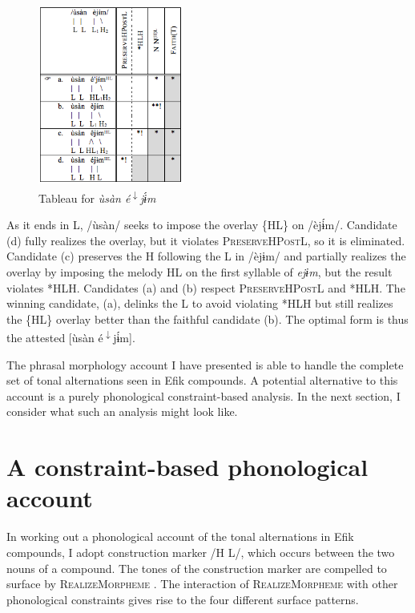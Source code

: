 \documentclass[output=paper]{langscibook}
\begin{document}
  
\begin{figure}
\includegraphics[width=48mm]{figures/glewwe-img5.png}
\caption{Tableau for \textit{ùsàn é\textsuperscript{$\downarrow$}jɨ́m}}
\label{fig:glewwe:6}
\end{figure}

As it ends in L, /ùsàn/ seeks to impose the overlay \{HL\} on /èjɨ́m/. Candidate (d) fully realizes the overlay, but it violates \textsc{PreserveHPostL}, so it is eliminated. Candidate (c) preserves the H following the L in /èjɨm/ and partially realizes the overlay by imposing the melody HL on the first syllable of \textit{ejɨm}, but the result violates *HLH. Candidates (a) and (b) respect \textsc{PreserveHPostL} and *HLH. The winning candidate, (a), delinks the L to avoid violating *HLH but still realizes the \{HL\} overlay better than the faithful candidate (b). The optimal form is thus the attested [ùsàn é\textsuperscript{$\downarrow$}jɨ́m]. 

The phrasal morphology account I have presented is able to handle the complete set of tonal alternations seen in Efik compounds. A potential alternative to this account is a purely phonological constraint-based analysis. In the next section, I consider what such an analysis might look like. 
 
\section{A constraint-based phonological account}\label{sec:glewwe:3}

In working out a phonological account of the tonal alternations in Efik compounds, I adopt  construction marker /H L/, which occurs between the two nouns of a compound. The tones of the construction marker are compelled to surface by \textsc{RealizeMorpheme} \citep{Gnanadesikan1997,Kurisu2001,Oostendorp2005}. The interaction of \textsc{RealizeMorpheme} with other phonological constraints gives rise to the four different surface patterns. 
\end{document}
